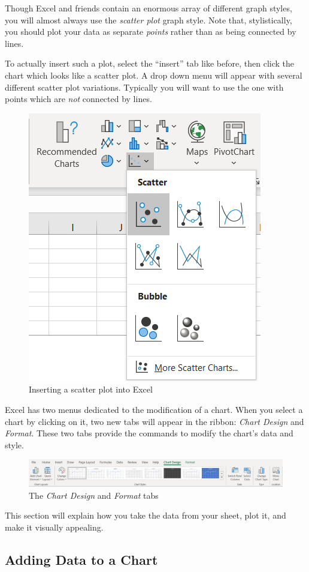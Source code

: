 \documentclass[10pt]{article}
\begin{document}
Though Excel and friends contain an enormous array of different graph styles, you will almost always use the \textit{scatter plot} graph style.
Note that, stylistically, you should plot your data as separate \textit{points} rather than as being connected by lines.

To actually insert such a plot, select the ``insert'' tab like before, then click the chart which looks like a scatter plot.
A drop down menu will appear with several different scatter plot variations.
Typically you will want to use the one with points which are \textit{not} connected by lines.

\begin{figure}[htpb]
	\centering
	\includegraphics[width=0.3\linewidth]{images/insert-scatter-plot.png}
	\caption{Inserting a scatter plot into Excel}%
	\label{fig:images_insert-scatter-plot}
\end{figure}


Excel has two menus dedicated to the modification of a chart.
When you select a chart by clicking on it, two new tabs will appear in the ribbon: \textit{Chart Design} and \textit{Format}.
These two tabs provide the commands to modify the chart's data and style.

\begin{figure}[htpb]
	\centering
	\includegraphics[width=1\linewidth]{images/chart-design-format.png}
	\caption{The \textit{Chart Design} and \textit{Format} tabs}%
	\label{fig:images_chart-design-format}
\end{figure}

This section will explain how you take the data from your sheet, plot it, and make it visually appealing.


\subsection{Adding Data to a Chart}%
\label{sub:adding_data_to_a_chart}
\end{document}
